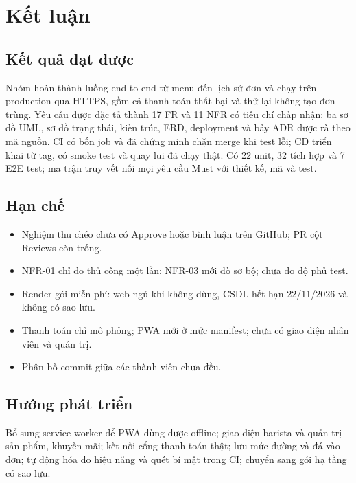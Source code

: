 \chapter{Kết luận}\label{ch:ketluan-se}
\section{Kết quả đạt được}\label{sec:se-dat}
Nhóm hoàn thành luồng end-to-end từ menu đến lịch sử đơn và chạy trên production qua HTTPS, gồm cả thanh toán thất bại và thử lại không tạo đơn trùng. Yêu cầu được đặc tả thành 17 FR và 11 NFR có tiêu chí chấp nhận; ba sơ đồ UML, sơ đồ trạng thái, kiến trúc, ERD, deployment và bảy ADR được rà theo mã nguồn. CI có bốn job và đã chứng minh chặn merge khi test lỗi; CD triển khai từ tag, có smoke test và quay lui đã chạy thật. Có 22 unit, 32 tích hợp và 7 E2E test; ma trận truy vết nối mọi yêu cầu Must với thiết kế, mã và test.

\section{Hạn chế}\label{sec:se-hanche}
\begin{itemize}
\item Nghiệm thu chéo chưa có Approve hoặc bình luận trên GitHub; PR cột Reviews còn trống.
\item NFR-01 chỉ đo thủ công một lần; NFR-03 mới dò sơ bộ; chưa đo độ phủ test.
\item Render gói miễn phí: web ngủ khi không dùng, CSDL hết hạn 22/11/2026 và không có sao lưu.
\item Thanh toán chỉ mô phỏng; PWA mới ở mức manifest; chưa có giao diện nhân viên và quản trị.
\item Phân bố commit giữa các thành viên chưa đều.
\end{itemize}

\section{Hướng phát triển}\label{sec:se-huong}
Bổ sung service worker để PWA dùng được offline; giao diện barista và quản trị sản phẩm, khuyến mãi; kết nối cổng thanh toán thật; lưu mức đường và đá vào đơn; tự động hóa đo hiệu năng và quét bí mật trong CI; chuyển sang gói hạ tầng có sao lưu.
